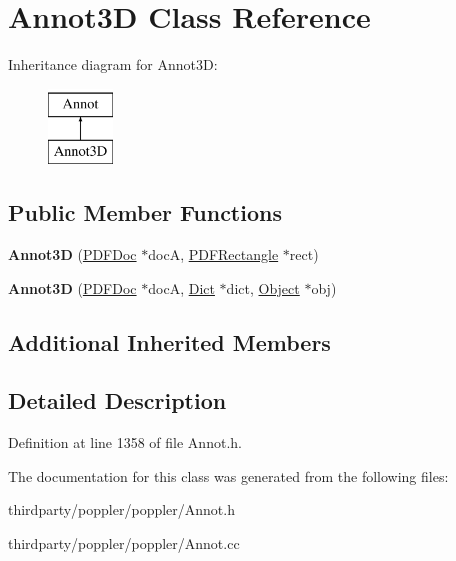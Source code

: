 \hypertarget{class_annot3_d}{}\section{Annot3D Class Reference}
\label{class_annot3_d}
Inheritance diagram for Annot3D\+:\begin{figure}[H]
\begin{center}
\leavevmode
\includegraphics[height=2.000000cm]{class_annot3_d}
\end{center}
\end{figure}
\subsection*{Public Member Functions}
\begin{DoxyCompactItemize}
\item 
\mbox{\label{class_annot3_d_ad870cf811b36e54a78f24ed616a354a4}} 
{\bfseries Annot3D} (\hyperlink{class_p_d_f_doc}{P\+D\+F\+Doc} $\ast$docA, \hyperlink{class_p_d_f_rectangle}{P\+D\+F\+Rectangle} $\ast$rect)
\item 
\mbox{\label{class_annot3_d_a81edfa30d927768a038df2c31facf6a5}} 
{\bfseries Annot3D} (\hyperlink{class_p_d_f_doc}{P\+D\+F\+Doc} $\ast$docA, \hyperlink{class_dict}{Dict} $\ast$dict, \hyperlink{class_object}{Object} $\ast$obj)
\end{DoxyCompactItemize}
\subsection*{Additional Inherited Members}


\subsection{Detailed Description}


Definition at line 1358 of file Annot.\+h.



The documentation for this class was generated from the following files\+:\begin{DoxyCompactItemize}
\item 
thirdparty/poppler/poppler/Annot.\+h\item 
thirdparty/poppler/poppler/Annot.\+cc\end{DoxyCompactItemize}
